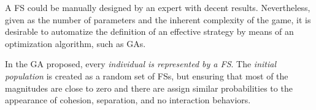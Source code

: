 \documentclass[a4paper]{llncs}
\begin{document}
%

A FS could be manually designed by an expert with decent results. Nevertheless, given as the number of parameters and the inherent complexity of the game, it is desirable to automatize the definition of an effective strategy by means of an optimization algorithm, such as GAs. 

In the GA proposed, every \textit{individual is represented by a FS}. The \textit{initial population} is created as a random set of FSs, but ensuring that most of the magnitudes are close to zero and there are assign similar probabilities to the appearance of cohesion, separation, and no interaction behaviors.
\end{document}
